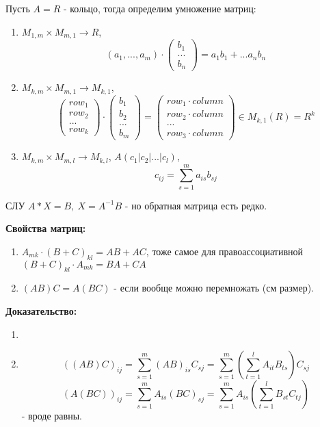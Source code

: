 \documentclass[12pt]{article}
\begin{document}
Пусть $A = R$ - кольцо, тогда определим умножение матриц:
\begin{enumerate}
    \item $M_{1,m} \times M_{m, 1} \rightarrow R$, $$(a_1, ..., a_m) \cdot \begin{pmatrix}
        b_1 \\
        ... \\
        b_n
    \end{pmatrix} = a_1b_1 + ... a_nb_n$$
    \item $M_{k,m} \times M_{m, 1} \rightarrow M_{k, 1}$, $$\begin{pmatrix}
        row_1 \\
        row_2 \\
        ... \\
        row_k
    \end{pmatrix} \cdot \begin{pmatrix}
        b_1 \\
        b_2 \\
        ... \\
        b_m
    \end{pmatrix} = \begin{pmatrix}
        row_1 \cdot column \\
        row_2 \cdot column \\
        ... \\
        row_3 \cdot column
    \end{pmatrix} \in M_{k, 1}(R) = R^k$$
    \item $M_{k,m} \times M_{m, l} \rightarrow M_{k, l}$, $A(c_1 | c_2 | ... | c_l)$, $$c_{ij} = \sum_{s = 1}^m {a_{is}b_{sj}}$$
\end{enumerate}

СЛУ $A*X = B, \ X = A^{-1}B$ - но обратная матрица есть редко.

\textbf{Свойства матриц:}
\begin{enumerate}
    \item $A_{mk} \cdot (B+C)_{kl} = AB + AC$, тоже самое для правоассоциативной $(B+C)_{kl} \cdot A_{mk}  = BA + CA$
    \item $(AB)C = A(BC)$ - если вообще можно перемножать (см размер).
\end{enumerate}
\textbf{Доказательство:} \begin{enumerate}
    \item {}
    \item $$((AB)C)_{ij} = \sum_{s = 1}^m {(AB)_{is}C_{sj}} = \sum_{s = 1}^m {(\sum_{t = 1}^l {A_{it}B_{ts}})C_{sj}}$$
    $$(A(BC))_{ij} = \sum_{s = 1}^m {A_{is}(BC)_{sj}} = \sum_{s = 1}^m {A_{is}(\sum_{t = 1}^l {B_{st}C_{tj}})}$$ - вроде равны.
\end{enumerate}
\end{document}
